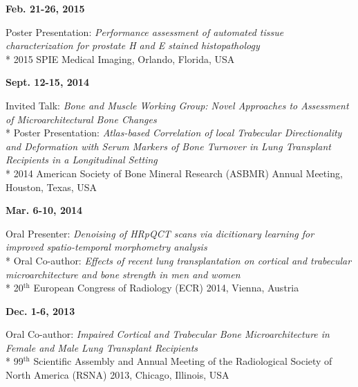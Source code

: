\documentclass[line,a4paper]{resume}
\newcommand{\superscript}[1]{\ensuremath{^{\text{#1}}}}
\begin{document}
\begin{resume}
\noindent
\begin{minipage}[t]{0.20\linewidth}
\textbf{Feb. 21-26, 2015}
\end{minipage}
\begin{minipage}[t]{0.80\linewidth}\raggedright
Poster Presentation: \emph{Performance assessment of automated tissue characterization for prostate H and E stained histopathology}\\*
2015 SPIE Medical Imaging, Orlando, Florida, USA
\end{minipage}

\noindent
\begin{minipage}[t]{0.20\linewidth}
\textbf{Sept. 12-15, 2014}
\end{minipage}
\begin{minipage}[t]{0.80\linewidth}\raggedright
Invited Talk: \emph{Bone and Muscle Working Group: Novel Approaches to Assessment of Microarchitectural Bone Changes}\\*
Poster Presentation: \emph{Atlas-based Correlation of local Trabecular Directionality and Deformation with Serum Markers of Bone Turnover in Lung Transplant Recipients in a Longitudinal Setting}\\*
2014 American Society of Bone Mineral Research (ASBMR) Annual Meeting, Houston, Texas, USA
\end{minipage}

\noindent
\begin{minipage}[t]{0.20\linewidth}
\textbf{Mar. 6-10, 2014}
\end{minipage}
\begin{minipage}[t]{0.80\linewidth}\raggedright
Oral Presenter: \emph{Denoising of HRpQCT scans via dicitionary learning for improved spatio-temporal morphometry analysis}\\*
Oral Co-author: \emph{Effects of recent lung transplantation on cortical and trabecular microarchitecture and bone strength in men and women}\\*
20\superscript{th} European Congress of Radiology (ECR) 2014, Vienna, Austria
\end{minipage}

\noindent
\begin{minipage}[t]{0.20\linewidth}
\textbf{Dec. 1-6, 2013}
\end{minipage}
\begin{minipage}[t]{0.80\linewidth}\raggedright
Oral Co-author: \emph{Impaired Cortical and Trabecular Bone Microarchitecture in Female and Male Lung Transplant Recipients}\\*
99\superscript{th} Scientific Assembly and Annual Meeting of the Radiological Society of North America (RSNA) 2013, Chicago, Illinois, USA
\end{minipage}


\end{resume}
\end{document}
